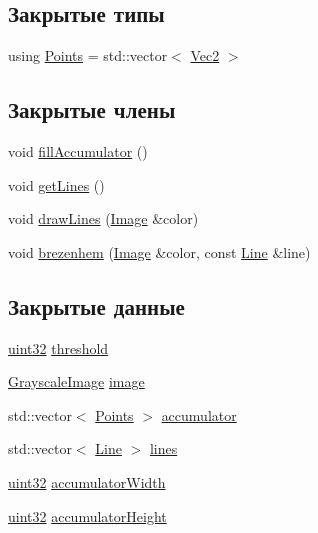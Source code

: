 \subsection*{Закрытые типы}
\begin{DoxyCompactItemize}
\item 
using \hyperlink{class_hough_transform_acca3cb75c9e1a69b38a0ef97a6b3e6ae}{Points} = std\+::vector$<$ \hyperlink{vec2_8h_a056bf34213a36593f50f333d7653fe1c}{Vec2} $>$
\end{DoxyCompactItemize}
\subsection*{Закрытые члены}
\begin{DoxyCompactItemize}
\item 
void \hyperlink{class_hough_transform_a9cbe414b810e761a1b776d268fd13fa5}{fill\+Accumulator} ()
\item 
void \hyperlink{class_hough_transform_a7292b312db2f7bbf90d52c755b9de28a}{get\+Lines} ()
\item 
void \hyperlink{class_hough_transform_a0eee01dc4d43dc5545b832513aeb6ff4}{draw\+Lines} (\hyperlink{class_image}{Image} \&color)
\item 
void \hyperlink{class_hough_transform_a2ea26ee041bf7dd1e50616d3411138cf}{brezenhem} (\hyperlink{class_image}{Image} \&color, const \hyperlink{class_line}{Line} \&line)
\end{DoxyCompactItemize}
\subsection*{Закрытые данные}
\begin{DoxyCompactItemize}
\item 
\hyperlink{number_8h_a1134b580f8da4de94ca6b1de4d37975e}{uint32} \hyperlink{class_hough_transform_aa9de5274a062b1725689fbbc6f0799f7}{threshold}
\item 
\hyperlink{class_grayscale_image}{Grayscale\+Image} \hyperlink{class_hough_transform_a0fe725cb1f0e3078096c3d7e9dee85f7}{image}
\item 
std\+::vector$<$ \hyperlink{class_hough_transform_acca3cb75c9e1a69b38a0ef97a6b3e6ae}{Points} $>$ \hyperlink{class_hough_transform_aaa271ada2195b2f0dba1a4611648fc2f}{accumulator}
\item 
std\+::vector$<$ \hyperlink{class_line}{Line} $>$ \hyperlink{class_hough_transform_abb2e77efd0688f3ea508c5f51b480f22}{lines}
\item 
\hyperlink{number_8h_a1134b580f8da4de94ca6b1de4d37975e}{uint32} \hyperlink{class_hough_transform_a1c2b5fa2274a44848f8737f396397137}{accumulator\+Width}
\item 
\hyperlink{number_8h_a1134b580f8da4de94ca6b1de4d37975e}{uint32} \hyperlink{class_hough_transform_aee054a46260dc381123d158617c0e7dc}{accumulator\+Height}
\end{DoxyCompactItemize}


